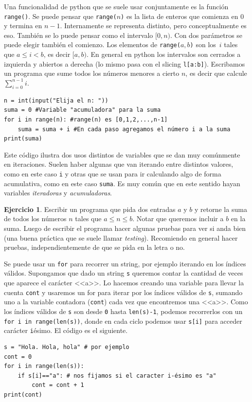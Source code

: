 \documentclass[a4paper, 12pt]{report}
\theoremstyle{definition}
\newtheorem{ejercicio}{Ejercicio}[section]
\begin{document}
Una funcionalidad de python que se suele usar conjuntamente es la función {\tt range()}. Se puede pensar que {\tt range($n$)} es la lista de enteros que comienza en $0$ y termina en $n-1$. Internamente se representa distinto, pero conceptualmente es eso. También se lo puede pensar como el intervalo $[0,n)$. Con dos parámetros se puede elegir también el comienzo. Los elementos de {\tt range($a,b$)} son los~$i$ tales que $a\leq i<b$, es decir $[a,b)$. En general en python los intervalos son cerrados a izquierda y abiertos a derecha (lo mismo pasa con el slicing {\tt l[a:b]}). Escribamos un programa que sume todos los números menores a cierto $n$, es decir que calcule $\sum_{i=0}^{n-1}i$.
\begin{verbatim}
n = int(input("Elija el n: "))
suma = 0 #Variable "acumuladora" para la suma
for i in range(n): #range(n) es [0,1,2,...,n-1]
    suma = suma + i #En cada paso agregamos el número i a la suma
print(suma)
\end{verbatim}
Este código ilustra dos usos distintos de variables que se dan muy comúnmente en iteraciones. Suelen haber algunas que van iterando entre distintos valores, como en este caso {\tt i} y otras que se usan para ir calculando algo de forma acumulativa, como en este caso {\tt suma}. Es muy común que en este sentido hayan variables {\sl iteradoras} y {\sl acumuladoras}.
\begin{ejercicio}
	Escribir un programa que pida dos entradas $a$ y $b$ y retorne la suma de todos los números $n$ tales que $a\leq n\leq b$. Notar que queremos incluir a $b$ en la suma. Luego de escribir el programa hacer algunas pruebas para ver si anda bien (una buena práctica que se suele llamar {\sl testing}). Recomiendo en general hacer pruebas, independientemente de que se pida en la letra o no.
\end{ejercicio}

Se puede usar un {\tt for} para recorrer un string, por ejemplo iterando en los índices válidos. Supongamos que dado un string {\tt s} queremos contar la cantidad de veces que aparece el carácter <<a>>. Lo hacemos creando una variable para llevar la cuenta {\tt cont} y usaremos un for para iterar por los índices válidos de {\tt s}, sumando uno a la variable contadora ({\tt cont}) cada vez que encontremos una <<a>>. Como los índices válidos de {\tt s} son desde {\tt 0} hasta {\tt len(s)-1}, podemos recorrerlos con un {\tt for i in range(len(s))}, donde en cada ciclo podemos usar {\tt s[i]} para acceder carácter {\tt i}ésimo. El código es el siguiente.
\begin{verbatim}
s = "Hola. Hola, hola" # por ejemplo
cont = 0
for i in range(len(s)):
    if s[i]=="a": # nos fijamos si el caracter i-ésimo es "a"
        cont = cont + 1
print(cont)
\end{verbatim}
\end{document}
